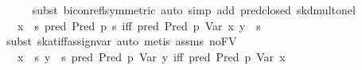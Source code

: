 \begin{isabellebody}
\ \ \ \ \isamarkupfalse%
\ {}subst\ bicon{}refl{}symmetric{}{}\ {}auto\ simp\ add{}\ pred{}closed\ skd{}mult{}onel{}\isanewline
\ \ \isamarkupfalse%
\ \isamarkupfalse%
\ {}{}{}{}\ {}\ x\ {}{}\ s{}\ pred\ {}Pred\ p\ {}s{}{}\ iff\ pred\ {}Pred\ p\ {}Var\ x{}{}{}\ y\ {}{}\ s{}\isanewline
\ \ \ \ \isamarkupfalse%
\ {}subst\ skat{}iff{}assign{}var{}\ auto{}\ metis\ assms\ no{}FV{}\isanewline
\ \ \isamarkupfalse%
\ \isamarkupfalse%
\ {}{}{}{}\ {}\ x\ {}{}\ s{}\ y\ {}{}\ s{}\ pred\ {}Pred\ p\ {}Var\ y{}{}\ iff\ pred\ {}Pred\ p\ {}Var\ x{}{}{}\isanewline

\end{isabellebody}
